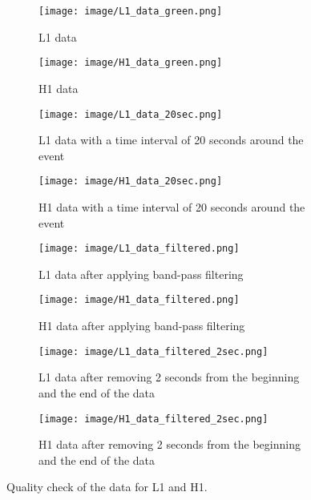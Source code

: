 \documentclass[11pt, letterpaper]{article}
\begin{document}
\begin{figure}[htbp]
  \centering

  
  \begin{subfigure}[b]{0.45\textwidth}
    \centering
    \texttt{[image: image/L1\_data\_green.png]}
    \caption{L1 data}
    \label{fig:DQ1}
  \end{subfigure}
  \hfill
  \begin{subfigure}[b]{0.45\textwidth}
    \centering
    \texttt{[image: image/H1\_data\_green.png]}
    \caption{H1 data}
    \label{fig:DQ2}
  \end{subfigure}

  
  \vspace{0.5cm}
  \begin{subfigure}[b]{0.45\textwidth}
    \centering
    \texttt{[image: image/L1\_data\_20sec.png]}
    \caption{L1 data with a time interval of 20 seconds around the event}
    \label{fig:strain_20_1}
  \end{subfigure}
  \hfill
  \begin{subfigure}[b]{0.45\textwidth}
    \centering
    \texttt{[image: image/H1\_data\_20sec.png]}
    \caption{H1 data with a time interval of 20 seconds around the event}
    \label{fig:strain_20_2}
  \end{subfigure}

 
  \vspace{0.5cm}
  \begin{subfigure}[b]{0.45\textwidth}
    \centering
    \texttt{[image: image/L1\_data\_filtered.png]}
    \caption{L1 data after applying band-pass filtering}
    \label{fig:strain_filtered_1}
  \end{subfigure}
  \hfill
  \begin{subfigure}[b]{0.45\textwidth}
    \centering
    \texttt{[image: image/H1\_data\_filtered.png]}
    \caption{H1 data after applying band-pass filtering}
    \label{fig:strain_filtered_2}
  \end{subfigure}

  
  \vspace{0.5cm}
  \begin{subfigure}[b]{0.45\textwidth}
    \centering
    \texttt{[image: image/L1\_data\_filtered\_2sec.png]}
    \caption{L1 data after removing 2 seconds from the beginning and the end of the data}
    \label{fig:resampled_data_1}
  \end{subfigure}
  \hfill
  \begin{subfigure}[b]{0.45\textwidth}
    \centering
    \texttt{[image: image/H1\_data\_filtered\_2sec.png]}
    \caption{H1 data after removing 2 seconds from the beginning and the end of the data}
    \label{fig:resampled_data_2}
  \end{subfigure}

  \caption{Quality check of the data for L1 and H1.}
  \label{fig:data_check}
\end{figure}
\end{document}
